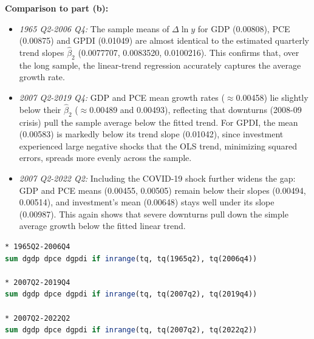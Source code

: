 \documentclass[a4paper,12pt]{article} %
\theoremstyle{nonitalic}
\newenvironment{solution}[1]
  {\renewcommand\theinnercustomsol{#1}%
   \innercustomsol}
  {\endinnercustomsol}
\newcounter{solutionctr}[section]
\renewcommand{\thesolutionctr}{(\alph{solutionctr})}
\newenvironment{autosolution}
  {\refstepcounter{solutionctr}%
   \begin{solution}{\thesolutionctr}}
  {\end{solution}}
\begin{document}
\begin{autosolution}
    \textbf{Comparison to part (b):}
    \begin{itemize}
        \item \emph{1965 Q2-2006 Q4:} The sample means of $\Delta\ln y$ for GDP (0.00808), PCE (0.00875) and GPDI (0.01049) are almost identical to the estimated quarterly trend slopes $\hat\beta_2$ (0.0077707, 0.0083520, 0.0100216). 
        This confirms that, over the long sample, the linear-trend regression accurately captures the average growth rate.
        \item \emph{2007 Q2-2019 Q4:} GDP and PCE mean growth rates ($\approx$0.00458) lie slightly below their $\hat\beta_2$ ($\approx$0.00489 and 0.00493), reflecting that downturns (2008-09 crisis) pull the sample average below the fitted trend. 
        For GPDI, the mean (0.00583) is markedly below its trend slope (0.01042), since investment experienced large negative shocks that the OLS trend, minimizing squared errors, spreads more evenly across the sample.
        \item \emph{2007 Q2-2022 Q2:} Including the COVID-19 shock further widens the gap: GDP and PCE means (0.00455, 0.00505) remain below their slopes (0.00494, 0.00514), and investment's mean (0.00648) stays well under its slope (0.00987). 
        This again shows that severe downturns pull down the simple average growth below the fitted linear trend.
    \end{itemize}
    \begin{lstlisting}[language=Stata]
* 1965Q2-2006Q4
sum dgdp dpce dgpdi if inrange(tq, tq(1965q2), tq(2006q4))

* 2007Q2-2019Q4
sum dgdp dpce dgpdi if inrange(tq, tq(2007q2), tq(2019q4))

* 2007Q2-2022Q2
sum dgdp dpce dgpdi if inrange(tq, tq(2007q2), tq(2022q2))
    \end{lstlisting}
\end{autosolution}
\end{document}
